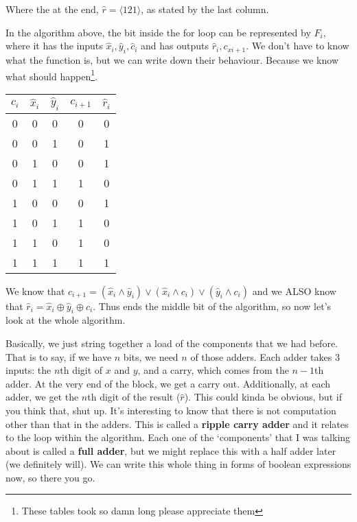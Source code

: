 \documentclass[11pt,a4paper,titlepage,dvipsnames,cmyk]{scrartcl}
\begin{document}
Where the at the end, $\hat r = \langle 1 2 1 \rangle$, as stated by the last
column.

In the algorithm above, the bit inside the for loop can be represented by $F_i$,
where it has the inputs $\hat x_i, \hat y_i, \hat c_i$ and has outputs 
$\hat r_i,c_{xi+1}$. We don't have to know what the function is, but we can write
down their behaviour. Because we know what should happen\footnote[1]{These tables
took so damn long please appreciate them}.

\begin{center}
    \begin{tabular}{|c c c|c|c|}
        \hline
        $c_i$ & $\hat x_i$ & $\hat y_i$ & $c_{i+1}$ & $\hat r_i$ \\
        \hline
        0 & 0 & 0 & 0 & 0 \\
        \hline
        0 & 0 & 1 & 0 & 1 \\
        \hline
        0 & 1 & 0 & 0 & 1 \\
        \hline
        0 & 1 & 1 & 1 & 0 \\
        \hline
        1 & 0 & 0 & 0 & 1 \\
        \hline
        1 & 0 & 1 & 1 & 0 \\
        \hline
        1 & 1 & 0 & 1 & 0 \\
        \hline
        1 & 1 & 1 & 1 & 1 \\
        \hline
    \end{tabular}
\end{center}

We know that $c_{i+1} = (\hat x_i \wedge \hat y_i) \vee (\hat x_i \wedge c_i)
\vee (\hat y_i \wedge c_i)$ and we ALSO know that $\hat r_i = \hat x_i \oplus
\hat y_i \oplus c_i$. Thus ends the middle bit of the algorithm, so now let's
look at the whole algorithm.

Basically, we just string together a load of the components that we had before.
That is to say, if we have $n$ bits, we need $n$ of those adders. Each adder
takes 3 inputs: the $n$th digit of $x$ and $y$, and a carry, which comes from
the $n-1$th adder. At the very end of the block, we get a carry out.
Additionally, at each adder, we get the $n$th digit of the result ($\hat r$).
This could kinda be obvious, but if you think that, shut up. It's interesting to
know that there is not computation other than that in the adders. This is called
a \textbf{ripple carry adder} and it relates to the loop within the algorithm.
Each one of the `components' that I was talking about is called a \textbf{full
adder}, but we might replace this with a half adder later (we definitely will).
We can write this whole thing in forms of boolean expressions now, so there you
go.
\end{document}
